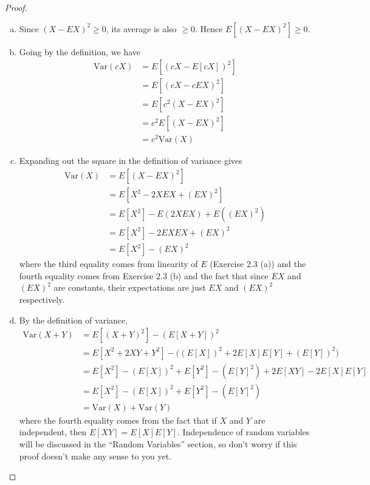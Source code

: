 \documentclass[11pt,letterpaper]{article}
\newcommand\var{\text{Var}}
\numberwithin{theorem}{section}
\numberwithin{definition}{section}
\numberwithin{lemma}{section}
\numberwithin{corollary}{section}
\numberwithin{proposition}{section}
\theoremstyle{definition}
\numberwithin{remark}{section}
\numberwithin{claim}{section}
\numberwithin{observation}{section}
\numberwithin{fact}{section}
\numberwithin{assumption}{section}
\numberwithin{example}{section}
\numberwithin{exercise}{section}
\begin{document}
\begin{proof}
$ $
\begin{enumerate}[(a)]
\item Since $(X - EX)^2 \geq 0$, its average is also $\geq 0$. Hence $E[(X - EX)^2] \geq 0$.

\item Going by the definition, we have
\begin{align*}
\var(cX) &= E[(cX - E[cX])^2] \\
&= E[(cX - cEX)^2] \\
&= E[c^2(X - EX)^2 ] \\
&= c^2 E[(X - EX)^2] \\
&= c^2 \var(X)
\end{align*}

\item Expanding out the square in the definition of variance gives
\begin{align*}
\var(X) &= E[(X - EX)^2] \\
&= E[X^2 - 2XEX + (EX)^2] \\
&= E[X^2] - E(2XEX) + E((EX)^2) \\
&= E[X^2] - 2EXEX + (EX)^2 \\
&= E[X^2] - (EX)^2
\end{align*}
where the third equality comes from linearity of $E$ (Exercise 2.3 (a)) and the fourth equality comes from Exercise 2.3 (b) and the fact that since $EX$ and $(EX)^2$ are constants, their expectations are just $EX$ and $(EX)^2$ respectively.

\item By the definition of variance,
\begin{align*}
    \var(X+Y) &= E[(X+Y)^2] - (E[X+Y])^2 \\
    &= E[X^2 + 2XY + Y^2] - \Big((E[X])^2 + 2E[X]E[Y] + (E[Y])^2\Big) \\
    &= E[X^2] - (E[X])^2 + E[Y^2] - (E[Y]^2) + 2E[XY] - 2E[X]E[Y] \\
    &= E[X^2] - (E[X])^2 + E[Y^2] - (E[Y]^2) \\
    &= \var(X) + \var(Y)
\end{align*}
where the fourth equality comes from the fact that if $X$ and $Y$ are independent, then $E[XY] = E[X]E[Y]$. Independence of random variables will be discussed in the ``Random Variables'' section, so don't worry if this proof doesn't make any sense to you yet.
\end{enumerate}
\end{proof}
\end{document}
